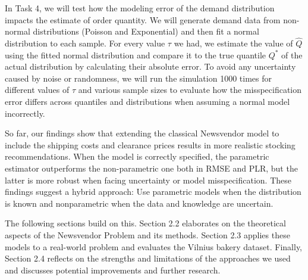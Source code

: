 In Task 4, we will test how the modeling error of the demand distribution impacts the estimate of order quantity. We will generate demand data from non-normal distributions (Poisson and Exponential) and then fit a normal distribution to each sample. For every value $\tau$ we had, we estimate the value of $\hat{Q}$ using the fitted normal distribution and compare it to the true quantile $Q^*$ of the actual distribution by calculating their absolute error. To avoid any uncertainty caused by noise or randomness, we will run the simulation 1000 times for different values of $\tau$ and various sample sizes to evaluate how the misspecification error differs across quantiles and distributions when assuming a normal model incorrectly.

So far, our findings show that extending the classical Newsvendor model to include the shipping costs and clearance prices results in more realistic stocking recommendations. When the model is correctly specified, the parametric estimator outperforms the non-parametric one both in RMSE and PLR, but the latter is more robust when facing uncertainty or model misspecification. These findings suggest a hybrid approach: Use parametric models when the distribution is known and nonparametric when the data and knowledge are uncertain.

The following sections build on this. Section 2.2 elaborates on the theoretical aspects of the Newsvendor Problem and its methods. Section 2.3 applies these models to a real-world problem and evaluates the Vilnius bakery dataset. Finally, Section 2.4 reflects on the strengths and limitations of the approaches we used and discusses potential improvements and further research.